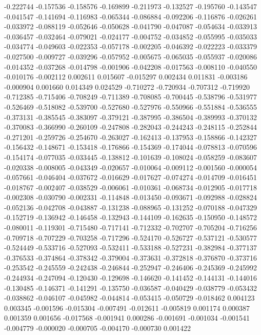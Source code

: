 -0.222744
-0.157536
-0.158576
-0.169899
-0.211973
-0.132527
-0.195760
-0.143547
-0.041547
-0.141694
-0.116983
-0.065344
-0.086884
-0.092206
-0.116876
-0.026261
-0.033972
-0.088119
-0.052646
-0.050628
-0.041790
-0.047087
-0.054634
-0.033913
-0.036457
-0.032464
-0.079021
-0.024177
-0.004752
-0.034852
-0.055995
-0.035033
-0.034774
-0.049603
-0.022353
-0.057178
-0.002205
-0.046392
-0.022223
-0.033379
-0.027500
-0.009727
-0.039296
-0.057952
-0.005675
-0.065035
-0.055937
-0.020086
-0.014352
-0.037268
-0.014798
-0.001906
-0.042208
-0.017563
-0.008110
-0.040550
-0.010176
-0.002112
0.002611
0.015607
-0.015297
0.002434
0.011831
-0.003186
-0.000904
0.001660
0.014349
0.024529
-0.710272
-0.720934
-0.707312
-0.719920
-0.712385
-0.715406
-0.708249
-0.711389
-0.708085
-0.700445
-0.538796
-0.531977
-0.526469
-0.518082
-0.539700
-0.527680
-0.527976
-0.550966
-0.551884
-0.536555
-0.373131
-0.385545
-0.383097
-0.379121
-0.387995
-0.386504
-0.389993
-0.370132
-0.370083
-0.366990
-0.260109
-0.247808
-0.282043
-0.244243
-0.248115
-0.252844
-0.271201
-0.259726
-0.254670
-0.263027
-0.162413
-0.137953
-0.158866
-0.142327
-0.156432
-0.148671
-0.153418
-0.176866
-0.154369
-0.174044
-0.078813
-0.070596
-0.154174
-0.077035
-0.033445
-0.138812
-0.101639
-0.108024
-0.058259
-0.083607
-0.020338
-0.008005
-0.043349
-0.020657
-0.010064
-0.009112
-0.001560
-0.000054
-0.057661
-0.046404
-0.037672
-0.016629
-0.017627
-0.074274
-0.014709
-0.016451
-0.018767
-0.002407
-0.038529
-0.006061
-0.010361
-0.068734
-0.012905
-0.017718
-0.002308
-0.030790
-0.002331
-0.114848
-0.013450
-0.093671
-0.092988
-0.028824
-0.052136
-0.042708
-0.043887
-0.131238
-0.088965
-0.131252
-0.070188
-0.047329
-0.152719
-0.136942
-0.146458
-0.132943
-0.144109
-0.162635
-0.150950
-0.148572
-0.080011
-0.119301
-0.715480
-0.717141
-0.712332
-0.702707
-0.705204
-0.716256
-0.709718
-0.707229
-0.703258
-0.717296
-0.524170
-0.526727
-0.537121
-0.530577
-0.524449
-0.533716
-0.527093
-0.532411
-0.533188
-0.527231
-0.382984
-0.377137
-0.376533
-0.374864
-0.378342
-0.379004
-0.373631
-0.372818
-0.376870
-0.373716
-0.253542
-0.245559
-0.242438
-0.246844
-0.252947
-0.246406
-0.245369
-0.245992
-0.244934
-0.247094
-0.120430
-0.129698
-0.146620
-0.141452
-0.144131
-0.144016
-0.130485
-0.146371
-0.141291
-0.135750
-0.036587
-0.040429
-0.038779
-0.053432
-0.038862
-0.046107
-0.045982
-0.044814
-0.053415
-0.050729
-0.018462
0.004123
0.003345
-0.001596
-0.015304
-0.007491
-0.012611
-0.005819
0.001174
0.000387
0.001359
0.001656
-0.017568
-0.001941
0.000286
-0.001691
-0.001034
-0.001541
-0.004779
-0.000020
-0.000705
-0.004170
-0.000730
0.001422
